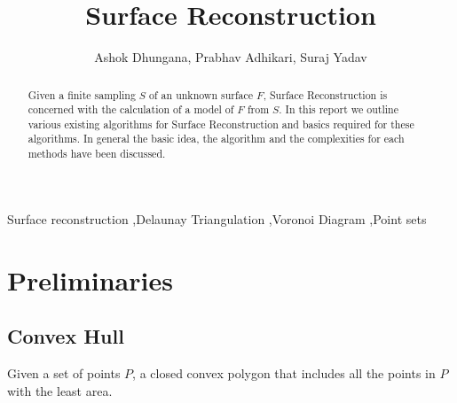 \documentclass[preprint,5p,times,twocolumn]{elsarticle}
\title{Surface Reconstruction}
\author{Ashok Dhungana, Prabhav Adhikari, Suraj Yadav}
\begin{document}
\begin{frontmatter}




\begin{abstract}
Given a finite sampling $S$ of an unknown surface $F$, Surface Reconstruction is concerned with the calculation of a model of $F$ from $S$. In this report we outline various existing algorithms for Surface Reconstruction and basics required for these algorithms. In general the basic idea, the algorithm and the complexities for each methods have been discussed. 
\end{abstract}

\begin{keyword}
Surface reconstruction \sep Delaunay Triangulation \sep Voronoi Diagram \sep Point sets

\end{keyword}

\end{frontmatter}


\section{Preliminaries}

\subsection{Convex Hull} Given a set of points $P$, a closed convex polygon that includes all the points in $P$ with the least area.
\end{document}
